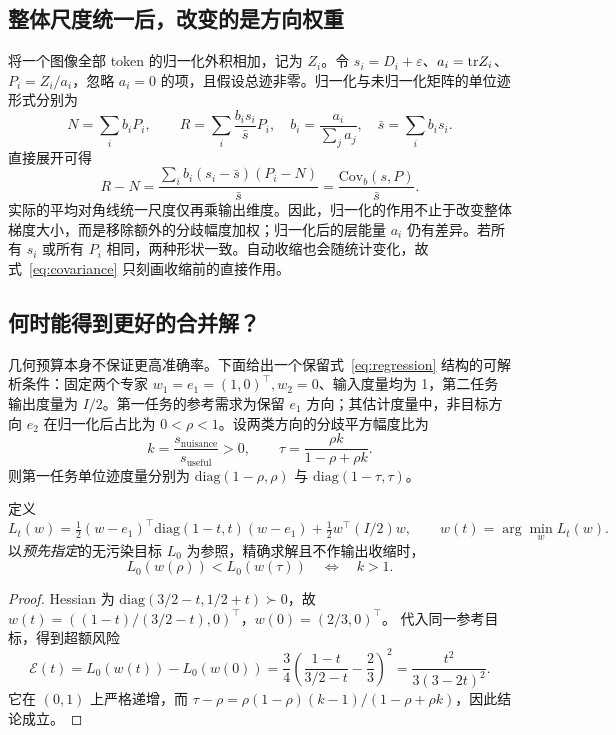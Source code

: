 \subsection{整体尺度统一后，改变的是方向权重}
将一个图像全部 token 的归一化外积相加，记为 $Z_i$。令 $s_i=D_i+\varepsilon$、$a_i=\mathrm{tr} Z_i$、$P_i=Z_i/a_i$，忽略 $a_i=0$ 的项，且假设总迹非零。归一化与未归一化矩阵的单位迹形式分别为
\begin{equation}
 N=\sum_i b_iP_i,\qquad R=\sum_i\frac{b_i s_i}{\bar s}P_i,
 \quad b_i=\frac{a_i}{\sum_j a_j},\quad\bar s=\sum_i b_i s_i.
\end{equation}
直接展开可得
\begin{equation}
 R-N=\frac{\sum_i b_i(s_i-\bar s)(P_i-N)}{\bar s}
 =\frac{\mathrm{Cov}_b(s,P)}{\bar s}.
 \label{eq:covariance}
\end{equation}
实际的平均对角线统一尺度仅再乘输出维度。因此，归一化的作用不止于改变整体梯度大小，而是移除额外的分歧幅度加权；归一化后的层能量 $a_i$ 仍有差异。若所有 $s_i$ 或所有 $P_i$ 相同，两种形状一致。自动收缩也会随统计变化，故式~\eqref{eq:covariance} 只刻画收缩前的直接作用。

\subsection{何时能得到更好的合并解？}
几何预算本身不保证更高准确率。下面给出一个保留式~\eqref{eq:regression} 结构的可解析条件：固定两个专家 $w_1=e_1=(1,0)^\top,w_2=0$、输入度量均为 1，第二任务输出度量为 $I/2$。第一任务的参考需求为保留 $e_1$ 方向；其估计度量中，非目标方向 $e_2$ 在归一化后占比为 $0<\rho<1$。设两类方向的分歧平方幅度比为
\begin{equation}
 k=\frac{s_{\mathrm{nuisance}}}{s_{\mathrm{useful}}}>0,
 \qquad \tau=\frac{\rho k}{1-\rho+\rho k}.
\end{equation}
则第一任务单位迹度量分别为 $\mathrm{diag}(1-\rho,\rho)$ 与 $\mathrm{diag}(1-\tau,\tau)$。

\begin{proposition}[两专家二次合并的风险边界]
\label{prop:advantage}
定义
\begin{equation}
 L_t(w)=\tfrac12(w-e_1)^\top\mathrm{diag}(1-t,t)(w-e_1)
 +\tfrac12 w^\top(I/2)w,
 \qquad w(t)=\arg\min_w L_t(w).
\end{equation}
以\emph{预先指定}的无污染目标 $L_0$ 为参照，精确求解且不作输出收缩时，
\begin{equation}
 L_0(w(\rho))<L_0(w(\tau))\quad\Longleftrightarrow\quad k>1.
\end{equation}
\end{proposition}
\begin{proof}
Hessian 为 $\mathrm{diag}(3/2-t,1/2+t)\succ0$，故
$w(t)=((1-t)/(3/2-t),0)^\top$，$w(0)=(2/3,0)^\top$。
代入同一参考目标，得到超额风险
\begin{equation}
 \mathcal E(t)=L_0(w(t))-L_0(w(0))
 =\frac34\left(\frac{1-t}{3/2-t}-\frac23\right)^2
 =\frac{t^2}{3(3-2t)^2}.
\end{equation}
它在 $(0,1)$ 上严格递增，而
$\tau-\rho=\rho(1-\rho)(k-1)/(1-\rho+\rho k)$，因此结论成立。
\end{proof}

